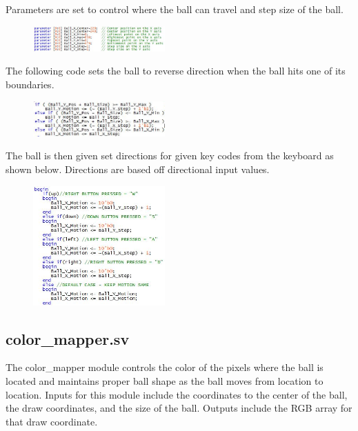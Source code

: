 \documentclass[journal, twocolumn, final,11pt,letterpaper]{IEEEtran}
\begin{document}
Parameters are set to control where the ball can travel and step size of the ball.

\begin{figure}[h]
	\centering
	\includegraphics[width=0.45\textwidth]{ballparam.jpg}
	\label{fig:ballparam}
\end{figure}

The following code sets the ball to reverse direction when the ball hits one of its boundaries. 

\begin{figure}[h]
	\centering
	\includegraphics[width=0.45\textwidth]{ballboundary.jpg}
	\label{fig:ballboundary}
\end{figure}

The ball is then given set directions for given key codes from the keyboard as shown below.  Directions are based off directional input values.

\begin{figure}[h]
	\centering
	\includegraphics[width=0.45\textwidth]{ballkey.jpg}
	\label{fig:ballkey}
\end{figure}


\subsection{color\_mapper.sv}
The color\_mapper module controls the color of the pixels where the ball is located and maintains proper ball shape as the ball moves from location to location.  Inputs for this module include the coordinates to the center of the ball, the draw coordinates, and the size of the ball.  Outputs include the RGB array for that draw coordinate. \\
\end{document}
